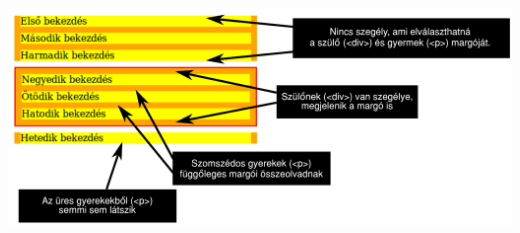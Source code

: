 \begin{frame}
  \begin{columns}[T]
      \begin{exampleblock}{}
        \scriptsize
        
      \end{exampleblock}
      \begin{exampleblock}{\vspace*{-3ex}}
        \scriptsize
        
      \end{exampleblock}
  \end{columns} 
\end{frame}

\begin{frame}
  \begin{center}
    \includegraphics[scale=0.55]{margok.pdf}
  \end{center}
\end{frame}
